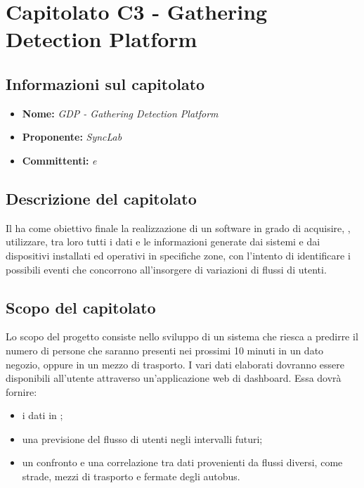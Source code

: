 \section{Capitolato C3 - Gathering Detection Platform}
\subsection{Informazioni sul capitolato}
\begin{itemize}
	\item \textbf{Nome:} \textit{GDP - Gathering Detection Platform} 
	\item \textbf{Proponente:} \textit{SyncLab}
	\item \textbf{Committenti:} \textit{\VT{} e \CR{}}
\end{itemize}

\subsection{Descrizione del capitolato}
Il  ha come obiettivo finale la realizzazione di un  software in grado di acquisire, , utilizzare,  tra loro tutti i dati e le informazioni generate dai sistemi e dai dispositivi installati ed operativi in specifiche zone, con l’intento di identificare i possibili eventi che concorrono all’insorgere di variazioni di flussi di utenti.

\subsection{Scopo del capitolato}
Lo scopo del progetto consiste nello sviluppo di un sistema che riesca a predirre il numero di persone che saranno presenti nei prossimi 10 minuti in un dato negozio, oppure in un mezzo di trasporto.
I vari dati elaborati dovranno essere disponibili all'utente attraverso un'applicazione web di dashboard. Essa dovrà fornire:
\begin{itemize}
	\item i dati in ;
	\item una previsione del flusso di utenti negli intervalli futuri;
	\item un confronto e una correlazione tra dati provenienti da flussi diversi, come strade, mezzi di trasporto e fermate degli autobus.
\end{itemize}

